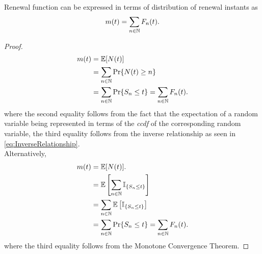 \documentclass[a4paper,10pt, english]{article}
\begin{document}
\begin{prop} Renewal function can be expressed in terms of distribution of renewal instants as
	\begin{align*} 
	m(t) = \sum_{n \in \mathbb{N}} F_n(t).
	\end{align*}
\end{prop}
\begin{proof} 
	\begin{align*}
	m(t) &= \mathbb{E}[N(t)] \\ 
	&= \sum_{n \in \mathbb{N}} \Pr\{N(t) \geq n\} \\ 
	&= \sum_{n \in \mathbb{N}} \Pr\{S_n \leq t\} = \sum_{n \in \mathbb{N}} F_n(t).
	\end{align*}
	where the second equality follows from the fact that the expectation of a random variable being represented in terms of the \emph{ccdf} of the corresponding random variable, the third equality follows from the inverse relationship as seen in \eqref{eq:InverseRelationship}.	\\
	Alternatively,
	\begin{align*}
	m(t) &= \mathbb{E}[N(t)]. \\
	&= \mathbb{E} \left[\sum_{n \in \mathbb{N}} \mathbb{I}_{\{S_n \leq t\}} \right] \\
	&= \sum_{n \in \mathbb{N}} \mathbb{E} \left[ \mathbb{I}_{\{S_n \leq t\}} \right] \\
	&= \sum_{n \in \mathbb{N}} \Pr\{S_n \leq t\} = \sum_{n \in \mathbb{N}} F_n(t).
	\end{align*}
	where the third equality follows from the Monotone Convergence Theorem.
\end{proof}
\end{document}
